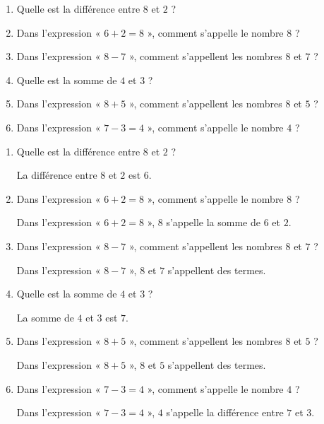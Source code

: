 \begin{exercice*}        
    \begin{enumerate}
        \item Quelle est la différence entre $8$ et $2$ ?
        \item Dans l'expression « $6 + 2 = 8$ », comment s'appelle le nombre $8$ ?
        \item Dans l'expression « $8 - 7$ », comment s'appellent les nombres $8$ et $7$ ?
        \item Quelle est la somme de $4$ et $3$ ?
        \item Dans l'expression « $8 + 5$ », comment s'appellent les nombres $8$ et $5$ ?
        \item Dans l'expression « $7 - 3 = 4$ », comment s'appelle le nombre $4$ ?
    \end{enumerate}
\end{exercice*}
\begin{corrige}
    \begin{enumerate}
        \item Quelle est la différence entre $8$ et $2$ ?
        
        {\red La différence entre $8$ et $2$ est $6$.}
        \item Dans l'expression « $6 + 2 = 8$ », comment s'appelle le nombre $8$ ?
        
        {\red Dans l'expression « $6 + 2 = 8$ », $8$ s'appelle la somme de $6$ et $2$.}
        \item Dans l'expression « $8 - 7$ », comment s'appellent les nombres $8$ et $7$ ?
        
        {\red Dans l'expression « $8 - 7$ », $8$ et $7$ s'appellent des termes.}
        \item Quelle est la somme de $4$ et $3$ ?
        
        {\red La somme de $4$ et $3$ est $7$.}
        \item Dans l'expression « $8 + 5$ », comment s'appellent les nombres $8$ et $5$ ?
        
        {\red Dans l'expression « $8 + 5$ », $8$ et $5$ s'appellent des termes.}
        \item Dans l'expression « $7 - 3 = 4$ », comment s'appelle le nombre $4$ ?
        
        {\red Dans l'expression « $7 - 3 = 4$ », $4$ s'appelle la différence entre $7$ et $3$.}
    \end{enumerate}
\end{corrige}

